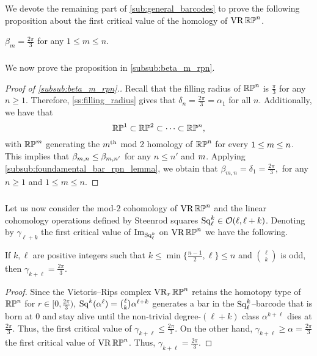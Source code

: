 We devote the remaining part of \cref{sub:general_barcodes} to prove the following proposition about the first critical value of the homology of $\operatorname{VR}\mathbb{RP}^n$.

\medskip\proposition
$\beta_m=\frac{2\pi}{3}$ for any $1\leq m\leq n$.

\subsubsection{}
We now prove the proposition in \cref{subsub:beta_m_rpn}.

\begin{proof}[Proof of \cref{subsub:beta_m_rpn}.]
	Recall that the filling radius of $\mathbb{RP}^n$ is $\frac{\pi}{3}$ for any $n \geq 1$.
	Therefore, \cref{ss:filling_radius} gives that $\delta_n = \tfrac{2\pi}{3} = \alpha_1$ for all $n$.
	Additionally, we have that
	\[
	\mathbb{RP}^1 \subset \mathbb{RP}^2 \subset \dots \subset \mathbb{RP}^n,
	\]
	with $\mathbb{RP}^m$ generating the $m^{\mathrm{th}}$ mod 2 homology of $\mathbb{RP}^n$ for every $1 \leq m \leq n$.
	This implies that $\beta_{m, n} \leq \beta_{m, n'}$ for any $n\leq n'$ and $m$.
	Applying \cref{subsub:foundamental_bar_rpn_lemma}, we obtain that $\beta_{m,n} = \delta_1 = \tfrac{2\pi}{3},$ for any $n\geq 1$ and $1 \leq m \leq n$.
\end{proof}

\subsubsection{}\label{subsub:gamma_rpn}

Let us now consider the mod-\(2\) cohomology of \(\operatorname{VR}\mathbb{RP}^n\) and the linear cohomology operations defined by Steenrod squares \(\operatorname{Sq}^k_\ell \in \mathcal{O}(\ell,\ell+k)\).
Denoting by \(\gamma_{\ell+k}\) the first critical value of \(\operatorname{Im}_{\operatorname{Sq}^k_\ell}\) on \(\operatorname{VR}\mathbb{RP}^n\) we have the following.

\medskip\proposition
If $k,\ell$ are positive integers such that $k \leq \min\{\frac{n-1}{2}, \ell\} \leq n$ and $\binom{\ell}{k}$ is odd, then $\gamma_{k+\ell} = \tfrac{2\pi}{3}$.

\begin{proof}
	Since the Vietoris--Rips complex $\operatorname{VR}_r\mathbb{RP}^n$ retains the homotopy type of $\mathbb{RP}^n$ for $r \in [0,\tfrac{2\pi}{3})$, $\operatorname{Sq}^k(\alpha^\ell) = \binom{\ell}{k}\alpha^{\ell+k}$ generates a bar in the $\operatorname{Sq}^k_\ell$--barcode that is born at $0$ and stay alive until the non-trivial degree-$(\ell+k)$ class $\alpha^{k+\ell}$ dies at $\tfrac{2\pi}{3}$.
	Thus, the first critical value of $\gamma_{k+\ell} \leq \tfrac{2\pi}{3}$.
	On the other hand, $\gamma_{k+\ell} \geq \alpha = \tfrac{2\pi}{3}$ the first critical value of $\operatorname{VR}\mathbb{RP}^n$.
	Thus, $\gamma_{k+\ell} = \tfrac{2\pi}{3}$.
\end{proof}

